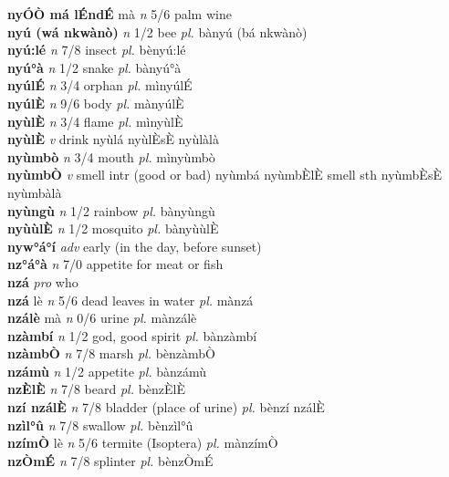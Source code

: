 \documentclass{article}
\begin{document}
{\bf nyÓÒ má lÉndÉ} mà {\it  n} 5/6 palm wine         \\ 
{\bf nyú (wá nkwànò)}  {\it n} 1/2 bee {\it pl.} bànyú (bá nkwànò)         \\ 
{\bf nyú:lé}  {\it n} 7/8 insect {\it pl.} bènyú:lé         \\ 
{\bf nyú°à}  {\it n} 1/2 snake {\it pl.} bànyú°à         \\ 
{\bf nyúlÉ}  {\it n} 3/4 orphan {\it pl.} mìnyúlÉ         \\ 
{\bf nyúlÈ}  {\it n} 9/6 body {\it pl.} mànyúlÈ         \\ 
{\bf nyùlÈ}  {\it n} 3/4 flame {\it pl.} mìnyùlÈ         \\ 
{\bf nyùlÈ}  {\it v} drink   nyùlá  nyùlÈsÈ nyùlàlà   \\ 
{\bf nyùmbò}  {\it n} 3/4 mouth {\it pl.} mìnyùmbò         \\ 
{\bf nyùmbÒ}  {\it v} smell intr (good or bad)   nyùmbá nyùmbÈlÈ smell sth nyùmbÈsÈ nyùmbàlà   \\ 
{\bf nyùngù}  {\it n} 1/2 rainbow {\it pl.} bànyùngù         \\ 
{\bf nyùùlÈ}  {\it n} 1/2 mosquito {\it pl.} bànyùùlÈ         \\ 
{\bf nyw°á°í}  {\it adv} early (in the day, before sunset)         \\ 
{\bf nz°á°à}  {\it n} 7/0 appetite for meat or fish         \\ 
{\bf nzá}  {\it pro} who         \\ 
{\bf nzá} lè {\it n} 5/6 dead leaves in water {\it pl.} mànzá         \\ 
{\bf nzálè} mà {\it n} 0/6 urine {\it pl.} mànzálè         \\ 
{\bf nzàmbí}  {\it n} 1/2 god, good spirit {\it pl.} bànzàmbí         \\ 
{\bf nzàmbÒ}  {\it n} 7/8 marsh {\it pl.} bènzàmbÒ         \\ 
{\bf nzámù}  {\it n} 1/2 appetite {\it pl.} bànzámù         \\ 
{\bf nzÈlÈ}  {\it n} 7/8 beard {\it pl.} bènzÈlÈ         \\ 
{\bf nzí nzálÈ}  {\it n} 7/8 bladder (place of urine) {\it pl.} bènzí nzálÈ         \\ 
{\bf nzìl°û}  {\it n} 7/8 swallow {\it pl.} bènzìl°û         \\ 
{\bf nzímÒ} lè {\it n} 5/6 termite (Isoptera) {\it pl.} mànzímÒ         \\ 
{\bf nzÒmÉ}  {\it n} 7/8 splinter {\it pl.} bènzÒmÉ         \\ 
\end{document}
